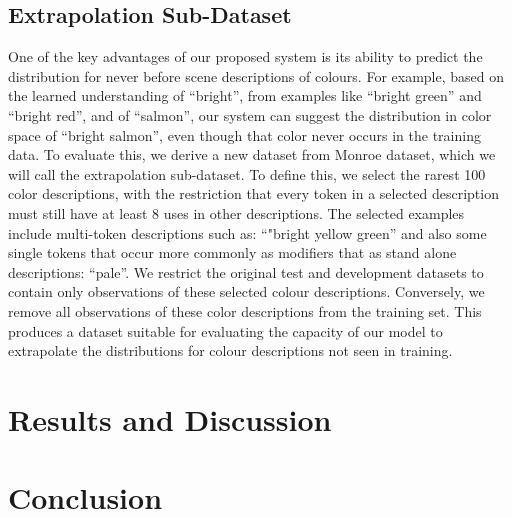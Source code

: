 \documentclass[]{article}
\begin{document}
\subsection{Extrapolation Sub-Dataset}
One of the key advantages of our proposed system is its ability to predict the distribution for never before scene descriptions of colours.
For example, based on the learned understanding of ``bright'', from examples like ``bright green'' and ``bright red'', and of ``salmon'', our system can suggest the distribution in color space of ``bright salmon'', even though that color never occurs in the training data.
To evaluate this, we derive a new dataset from Monroe dataset, which we will call the extrapolation sub-dataset.
To define this, we select the rarest 100 color descriptions,
with the restriction that every token in a selected description must still have at least 8 uses in other descriptions.
The selected examples include multi-token descriptions such as: ``"bright yellow green'' and also some single tokens that occur more commonly as modifiers that as stand alone descriptions: ``pale''.
We restrict the original test and development datasets to contain only observations of these selected colour descriptions.
Conversely, we remove all observations of these color descriptions from the training set.
This produces a dataset suitable for evaluating the capacity of our model to extrapolate the distributions for colour descriptions not seen in training.




\section{Results and Discussion}
\section{Conclusion}
\end{document}
